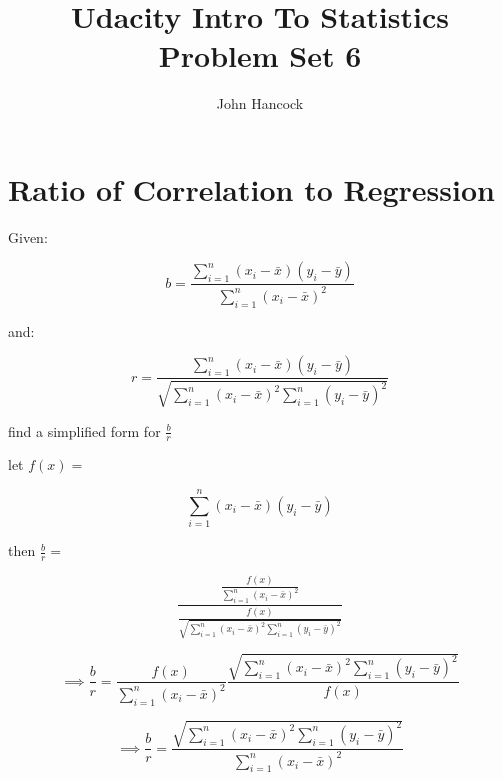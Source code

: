 \documentclass[a4paper,11pt]{article}
\author{John Hancock}
\title{Udacity Intro To Statistics Problem Set 6}
\begin{document}
\maketitle
\tableofcontents
\section{Ratio of Correlation to Regression}
Given:

\begin{equation}
b = 
  \frac{ \sum_{i=1}^n \left(x_i - \bar{x}\right)\left(y_i - \bar{y}\right) } 
    { \sum_{i=1}^n \left(x_i - \bar{x} \right)^2 }
\end{equation}

and:

\begin{equation}
r = 
  \frac{ \sum_{i=1}^n \left(x_i - \bar{x}\right)\left(y_i - \bar{y}\right) }
   { \sqrt{\sum_{i=1}^n \left(x_i - \bar{x} \right)^2 
      \sum_{i=1}^n \left(y_i - \bar{y} \right)^2 } }
\end{equation}

find a simplified form for $\frac{b}{r}$

let $f\left( x \right ) = $

\begin{equation}
  \sum_{i=1}^n \left(x_i - \bar{x}\right)\left(y_i - \bar{y}\right) 
\end{equation}

then $\frac{b}{r} = $

\begin{equation}
  \frac{ 
    \frac { f \left(x\right) } { \sum_{i=1}^n \left(x_i - \bar{x} \right)^2 }
    }
    {\frac 
      { f \left(x\right) }
      {
        \sqrt{\sum_{i=1}^n \left(x_i - \bar{x} \right)^2 
        \sum_{i=1}^n \left(y_i - \bar{y} \right)^2 } 
      }
    }
\end{equation}


\begin{equation}
\implies
\frac{b}{r} = 
  \frac { f \left(x\right) } { \sum_{i=1}^n \left(x_i - \bar{x} \right)^2 }
  \frac  {
        \sqrt{\sum_{i=1}^n \left(x_i - \bar{x} \right)^2 
        \sum_{i=1}^n \left(y_i - \bar{y} \right)^2 } 
      }
      { f \left(x\right) }
\end{equation}

\begin{equation}
\implies
\frac{b}{r} = 
  \frac
    {
      \sqrt{\sum_{i=1}^n \left(x_i - \bar{x} \right)^2 
      \sum_{i=1}^n \left(y_i - \bar{y} \right)^2 } 
    }
    {
      \sum_{i=1}^n \left(x_i - \bar{x} \right)^2 
    }
\end{equation}
\end{document}
